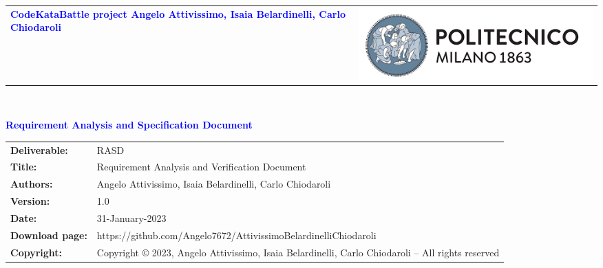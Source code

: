 




\begin{titlepage}



{\begin{table}[t!]
\centering
\begin{tabu} to \textwidth { X[1.3,r,p] X[1.7,l,p] }
\textcolor{Blue}
{\textbf{\small{CodeKataBattle project Angelo Attivissimo, Isaia Belardinelli, Carlo Chiodaroli}}} & \includegraphics[scale=0.5]{Images/PolimiLogo}
\end{tabu}
\end{table}}~\\ [7cm]


\begin{flushleft}

{\textcolor{Blue}{\textbf{\Huge{Requirement Analysis and Specification
        Document}}}} \\ [1cm]

\end{flushleft}

\end{titlepage}

\begin{table}[h!]
\begin{tabu} to \textwidth { X[0.3,r,p] X[0.7,l,p] }
\hline

\textbf{Deliverable:} & RASD\\
\textbf{Title:} & Requirement Analysis and Verification Document \\
\textbf{Authors:} & Angelo Attivissimo, Isaia Belardinelli, Carlo Chiodaroli \\
\textbf{Version:} & 1.0 \\ 
\textbf{Date:} & 31-January-2023 \\
\textbf{Download page:} & https://github.com/Angelo7672/AttivissimoBelardinelliChiodaroli \\
\textbf{Copyright:} & Copyright © 2023, Angelo Attivissimo, Isaia Belardinelli, Carlo Chiodaroli – All rights reserved \\
\hline
\end{tabu}
\end{table}




